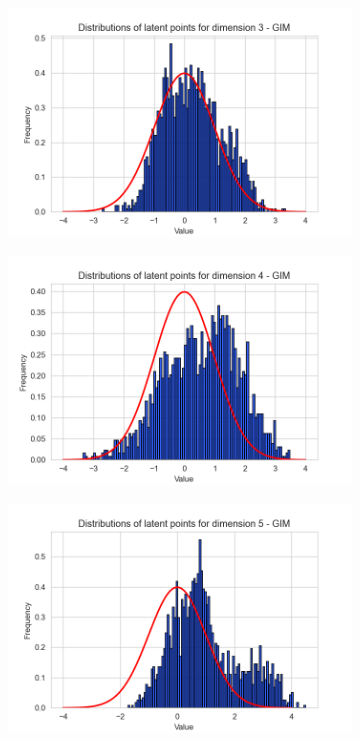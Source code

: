 \begin{figure}[h]
\begin{subfigure}[b]{0.25\textwidth}
		\includegraphics[width=1\linewidth]{"graphs/distr/module2 kld0035/_ distribution_latent_space_GIM_dim=2"}
	\end{subfigure}
	\hfill
	\begin{subfigure}[b]{0.25\textwidth}
		\centering
		\includegraphics[width=1\linewidth]{"graphs/distr/module2 kld0035/_ distribution_latent_space_GIM_dim=3"}
	\end{subfigure}
	\hfill
	\begin{subfigure}[b]{0.25\textwidth}
		\centering
		\includegraphics[width=1\linewidth]{"graphs/distr/module2 kld0035/_ distribution_latent_space_GIM_dim=4"}

\end{subfigure}
\end{figure}
